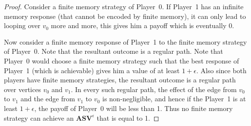 \begin{proof}
Consider a finite memory strategy of Player~0. If Player~1 has an infinite memory response (that cannot be encoded by finite memory), it can only lead to looping over $v_0$ more and more, this gives him a payoff
which is eventually 0.

Now consider a finite memory response of Player~1 to the finite memory strategy of Player~0. Note that the resultant outcome is a regular path. Note that Player~0 would choose a finite memory strategy such that the
best response of Player~1 (which is achievable) gives him a value of at least $1 + \epsilon$. Also since both players have finite memory strategies, the resultant outcome is a regular path over vertices $v_0$ and $v_1$. In
every such regular path, the effect of the edge from $v_0$ to $v_1$ and the
edge from $v_1$ to $v_0$ is non-negligible, and hence if the Player~1 is at
least $1 + \epsilon$, the payoff of Player~0 will be less than 1. Thus no
finite memory strategy can achieve an $\mathbf{ASV}^{\epsilon}$ that is equal to 1. 

\end{proof}